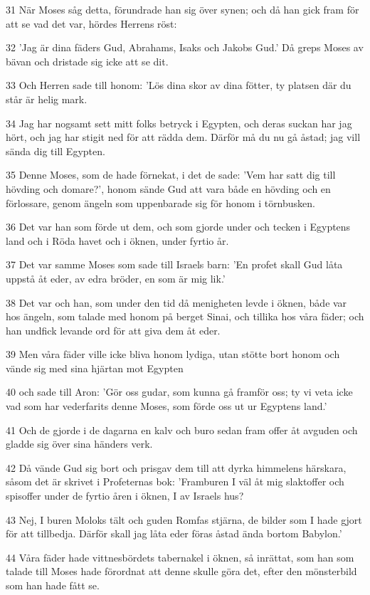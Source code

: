 \par 31 När Moses såg detta, förundrade han sig över synen; och då han gick fram för att se vad det var, hördes Herrens röst:
\par 32 'Jag är dina fäders Gud, Abrahams, Isaks och Jakobs Gud.' Då greps Moses av bävan och dristade sig icke att se dit.
\par 33 Och Herren sade till honom: 'Lös dina skor av dina fötter, ty platsen där du står är helig mark.
\par 34 Jag har nogsamt sett mitt folks betryck i Egypten, och deras suckan har jag hört, och jag har stigit ned för att rädda dem. Därför må du nu gå åstad; jag vill sända dig till Egypten.
\par 35 Denne Moses, som de hade förnekat, i det de sade: 'Vem har satt dig till hövding och domare?', honom sände Gud att vara både en hövding och en förlossare, genom ängeln som uppenbarade sig för honom i törnbusken.
\par 36 Det var han som förde ut dem, och som gjorde under och tecken i Egyptens land och i Röda havet och i öknen, under fyrtio år.
\par 37 Det var samme Moses som sade till Israels barn: 'En profet skall Gud låta uppstå åt eder, av edra bröder, en som är mig lik.'
\par 38 Det var och han, som under den tid då menigheten levde i öknen, både var hos ängeln, som talade med honom på berget Sinai, och tillika hos våra fäder; och han undfick levande ord för att giva dem åt eder.
\par 39 Men våra fäder ville icke bliva honom lydiga, utan stötte bort honom och vände sig med sina hjärtan mot Egypten
\par 40 och sade till Aron: 'Gör oss gudar, som kunna gå framför oss; ty vi veta icke vad som har vederfarits denne Moses, som förde oss ut ur Egyptens land.'
\par 41 Och de gjorde i de dagarna en kalv och buro sedan fram offer åt avguden och gladde sig över sina händers verk.
\par 42 Då vände Gud sig bort och prisgav dem till att dyrka himmelens härskara, såsom det är skrivet i Profeternas bok: 'Framburen I väl åt mig slaktoffer och spisoffer under de fyrtio åren i öknen, I av Israels hus?
\par 43 Nej, I buren Moloks tält och guden Romfas stjärna, de bilder som I hade gjort för att tillbedja. Därför skall jag låta eder föras åstad ända bortom Babylon.'
\par 44 Våra fäder hade vittnesbördets tabernakel i öknen, så inrättat, som han som talade till Moses hade förordnat att denne skulle göra det, efter den mönsterbild som han hade fått se.
